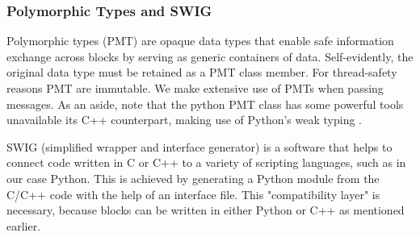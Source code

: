 \subsubsection{Polymorphic Types and SWIG} 

Polymorphic types (PMT) are opaque data types that enable safe information exchange across blocks by serving as generic containers of data. Self-evidently, the original data type must be retained as a PMT class member. For thread-safety reasons PMT are immutable. We make extensive use of PMTs when passing messages. As an aside, note that the python PMT class has some powerful tools unavailable its C++ counterpart, making use of Python's weak typing \cite{GRDocs}.

SWIG (simplified wrapper and interface generator) is a software that helps to connect code written in C or C++ to a variety of scripting languages, such as in our case Python. This is achieved by generating a Python module from the C/C++ code with the help of an interface file. This "compatibility layer" is necessary, because blocks can be written in either Python or C++ as mentioned earlier.